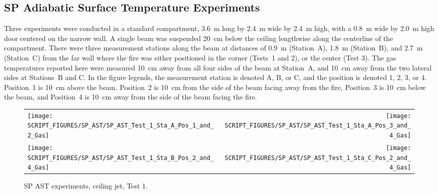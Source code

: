\clearpage


\subsection{SP Adiabatic Surface Temperature Experiments}

Three experiments were conducted in a standard compartment, 3.6~m long by 2.4~m wide by 2.4~m high, with a 0.8~m wide by 2.0~m high door centered on the narrow wall. A single beam was suspended 20~cm below the ceiling lengthwise along the centerline of the compartment. There were three measurement stations along the beam at distances of 0.9~m (Station~A), 1.8~m (Station~B), and 2.7~m (Station~C) from the far wall where the fire was either positioned in the corner (Tests~1 and 2), or the center (Test 3). The gas temperatures reported here were measured 10~cm away from all four sides of the beam at Station~A, and 10~cm away from the two lateral sides at Stations~B and C. In the figure legends, the measurement station is denoted A, B, or C, and the position is denoted 1, 2, 3, or 4. Position~1 is 10~cm above the beam. Position~2 is 10~cm from the side of the beam facing away from the fire, Position~3 is 10~cm below the beam, and Position~4 is 10~cm away from the side of the beam facing the fire.

\begin{figure}[!h]
\begin{tabular*}{\textwidth}{l@{\extracolsep{\fill}}r}
\texttt{[image: SCRIPT\_FIGURES/SP\_AST/SP\_AST\_Test\_1\_Sta\_A\_Pos\_1\_and\_2\_Gas]} &
\texttt{[image: SCRIPT\_FIGURES/SP\_AST/SP\_AST\_Test\_1\_Sta\_A\_Pos\_3\_and\_4\_Gas]} \\
\texttt{[image: SCRIPT\_FIGURES/SP\_AST/SP\_AST\_Test\_1\_Sta\_B\_Pos\_2\_and\_4\_Gas]} &
\texttt{[image: SCRIPT\_FIGURES/SP\_AST/SP\_AST\_Test\_1\_Sta\_C\_Pos\_2\_and\_4\_Gas]}
\end{tabular*}
\caption{SP AST experiments, ceiling jet, Test 1.}
\label{SP_Test_1_Gas}
\end{figure}

\newpage

